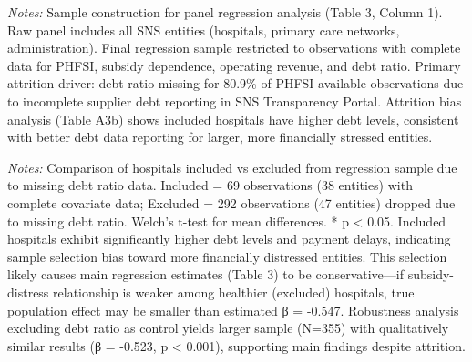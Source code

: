 \documentclass[12pt,oneside]{article}
\begin{document}
\begin{table}[htbp]
\centering
\caption{Sample Construction Flowchart}
\label{tab:sample_construction}
\footnotesize
\begin{threeparttable}

\begin{tablenotes}
\small
\item \textit{Notes:} Sample construction for panel regression analysis (Table 3, Column 1). Raw panel includes all SNS entities (hospitals, primary care networks, administration). Final regression sample restricted to observations with complete data for PHFSI, subsidy dependence, operating revenue, and debt ratio. Primary attrition driver: debt ratio missing for 80.9\% of PHFSI-available observations due to incomplete supplier debt reporting in SNS Transparency Portal. Attrition bias analysis (Table A3b) shows included hospitals have higher debt levels, consistent with better debt data reporting for larger, more financially stressed entities.
\end{tablenotes}
\end{threeparttable}
\end{table}

\begin{table}[htbp]
\centering
\caption{Attrition Bias Diagnostics}
\label{tab:attrition_bias}
\footnotesize
\begin{threeparttable}

\begin{tablenotes}
\small
\item \textit{Notes:} Comparison of hospitals included vs excluded from regression sample due to missing debt ratio data. Included = 69 observations (38 entities) with complete covariate data; Excluded = 292 observations (47 entities) dropped due to missing debt ratio. Welch's t-test for mean differences. * p < 0.05. Included hospitals exhibit significantly higher debt levels and payment delays, indicating sample selection bias toward more financially distressed entities. This selection likely causes main regression estimates (Table 3) to be conservative—if subsidy-distress relationship is weaker among healthier (excluded) hospitals, true population effect may be smaller than estimated β = -0.547. Robustness analysis excluding debt ratio as control yields larger sample (N=355) with qualitatively similar results (β = -0.523, p < 0.001), supporting main findings despite attrition.
\end{tablenotes}
\end{threeparttable}
\end{table}
\end{document}
